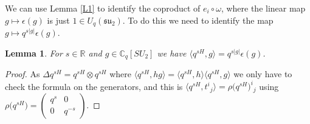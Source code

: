 \documentclass[10pt,a4paper]{amsart}
\numberwithin{equation}{section}
\newtheorem{Lemma}[Theorem]{Lemma}
\newcommand{\tens}{\mathop{\otimes}}
\newcommand{\R}{\mathbb{R}}
\newcommand{\C}{\mathbb{C}}
\newcommand{\<}{\langle}
\renewcommand{\>}{\rangle}
\begin{document}
We can use Lemma \ref{L1} to identify the coproduct of $ e_{i} \circ \omega $, where the linear map $ g\mapsto \epsilon(g) $ is just $ 1\in U_{q}({\mathfrak{su}}_{2}) $. To do this we need to identify the map $ g\mapsto q^{s|g|}\epsilon(g) $.
\begin{Lemma}\label{L2}
	For $ s \in \R$ and $ g\in \C_{q}[SU_{2}] $ we have $\langle q^{sH}, g\rangle= q^{s|g|} \epsilon (g) $.
\end{Lemma}
\begin{proof}As $ \Delta q^{s H}=q^{s H} \tens q^{sH} $ where $ \big\langle q^{sH},hg\big\rangle= \big\langle q^{s H},h\big\rangle \big\langle q^{s H}, g \big\rangle $
we only have to check the formula on the generators, and this is $ \big\langle q^{s H}, t^{i} {}_{j}\big\rangle= \rho \big(q^{s H} \big)^{i} {}_{j} $ using $ \rho\big(q^{s H}\big) = \left( \begin{smallmatrix}
	q^{s} & 0\\
	0& q^{-s}
\end{smallmatrix}
\right)$.
\end{proof}
\end{document}
